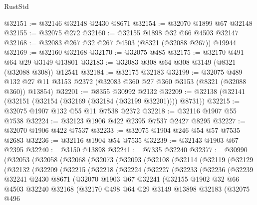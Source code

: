 \begin{lexlean}{RustStd}
\begin{coremodule}
@32151 := @32146 @32148 @2430 @8671
@32154 := @32070 @1899 @67 @32148
@32155 := @32075 @272
@32160 := @32155 @1898 @32 @66 @4503 @32147
@32168 := @32083 @267 @32 @267 @4503 (@8321 (@32088 @267)) @19944
@32169 := @32160 @32168
@32170 := @32075 @485
@32175 := @32170 @491 @64 @29 @3149 @13801
@32183 := @32083 @308 @64 @308 @3149 (@8321 (@32088 @308)) @12541
@32184 := @32175 @32183
@32199 := @32075
    @489
    @132
    @27
    @11
    @3153
    @2372
    (@32083 @360 @27 @360 @3153 (@8321 (@32088 @360)) @13854)
@32201 := @8355 @30992 @2132
@32209 := @32138 (@32141 (@32151 (@32154 (@32169 (@32184 (@32199 @32201)))) @8731))
@32215 := @32075 @1907 @132 @55 @11 @7538 @2372
@32218 := @32116 @1907 @55 @7538
@32224 := @32123 @1906 @422 @2395 @7537 @2427 @8295
@32227 := @32070 @1906 @422 @7537
@32233 := @32075 @1904 @246 @54 @57 @7535 @2683
@32236 := @32116 @1904 @54 @7535
@32239 := @32143 @1903 @67 @2395
@32240 := @3150 @13898
@32241 := @7335 @32240
@32377 := @30990
    (@32053
      (@32058
        (@32068
          (@32073
            (@32093
              (@32108
                (@32114
                  (@32119
                    (@32129
                      (@32132
                        (@32209
                          (@32215
                            (@32218
                              (@32224
                                (@32227
                                  (@32233
                                    (@32236
                                      (@32239
                                        @32241
                                        @2430
                                        @8671
                                        (@32070
                                          @1903
                                          @67
                                          @32241
                                          (@32155
                                            @1902
                                            @32
                                            @66
                                            @4503
                                            @32240
                                            @32168
                                            (@32170
                                              @498
                                              @64
                                              @29
                                              @3149
                                              @13898
                                              @32183
                                              (@32075
                                                @496

\end{coremodule}
\end{lexlean}
